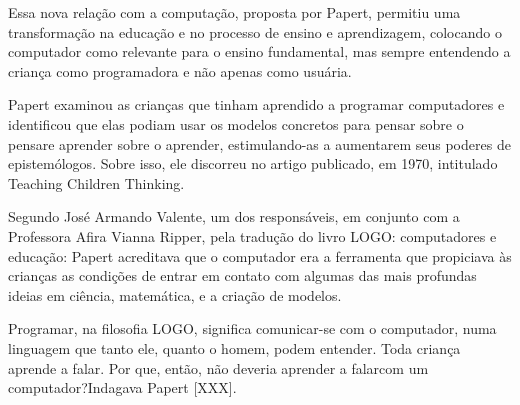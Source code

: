 \documentclass[
12pt,		%
openright,	%
twoside,  %
a4paper,			%
chapter=TITLE,		%
english,			%
french,				%
spanish,			%
brazil				%
]{USPSC-classe/USPSC}
\begin{document}
\noindent\begin{center}\mbox{\centering{}}\end{center}


Essa nova rela\c{c}\~ao com a computa\c{c}\~ao, proposta por Papert, permitiu uma transforma\c{c}\~ao na educa\c{c}\~ao e no processo de ensino e aprendizagem, colocando o computador como relevante para o ensino fundamental, mas sempre entendendo a crian\c{c}a como programadora e n\~ao apenas como usu\'aria.










Papert examinou as crian\c{c}as que tinham aprendido a programar computadores e identificou que elas podiam usar os modelos concretos para \textquotedbl pensar sobre o pensar\textquotedbl  e \textquotedbl aprender sobre o aprender\textquotedbl  [XXX], estimulando-as  a aumentarem seus poderes de epistem\'ologos. Sobre isso, ele discorreu no artigo publicado, em 1970, intitulado Teaching Children Thinking.










Segundo Jos\'e Armando Valente, um dos respons\'aveis, em conjunto com a Professora Afira Vianna Ripper, pela tradu\c{c}\~ao do livro LOGO: computadores e educa\c{c}\~ao: \textquotedbl Papert acreditava que o computador era a ferramenta que propiciava \`as crian\c{c}as as condi\c{c}\~oes de entrar em contato com algumas das mais profundas ideias em ci\^encia, matem\'atica, e a cria\c{c}\~ao de modelos\textquotedbl .










Programar, na filosofia LOGO, significa \textquotedbl comunicar-se com o computador, numa linguagem que tanto ele, quanto o homem,  podem entender\textquotedbl . Toda crian\c{c}a aprende a falar. Por que, ent\~ao, n\~ao deveria aprender a \textquotedbl falar\textquotedbl  com um computador?\textquotedbl  Indagava Papert [XXX].
\end{document}
